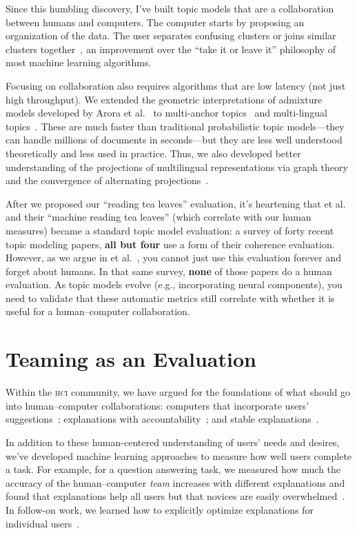 \documentclass[11pt]{amsart}
\newcommand{\abr}[1]{\textsc{#1}}
\newcommand{\newcite}[2]{\capitalisewords{#1} et al.~\cite{#1-#2}}
\begin{document}
Since this humbling discovery, I've built topic models that are a
collaboration between humans and computers.  The computer starts by
proposing an organization of the data.  The user separates confusing
clusters or joins similar clusters together~\cite{hu-14:itm}, an
improvement over the ``take it or leave it'' philosophy of most
machine learning algorithms.

Focusing on collaboration also requires algorithms that are low
latency (not just high throughput). We extended the
geometric interpretations of admixture models developed by Arora et
al.~\cite{arora-12} to multi-anchor topics~\cite{lund-17} and
multi-lingual topics~\cite{Yuan-18}.
%
These are much faster than traditional probabilistic topic
models---they can handle millions of documents in seconds---but they
are less well understood theoretically and less used in practice.
%
Thus, we also developed better understanding of the projections of
multilingual representations via graph theory~\cite{Fujinuma-19} and
the convergence of alternating projections~\cite{Zhang-19}.

After we proposed our ``reading tea leaves'' evaluation, it's
heartening that \newcite{lau}{14} and their ``machine reading tea
leaves'' (which correlate with our human measures) became a standard
topic model evaluation: a survey of forty recent topic modeling
papers, {\bf all but four} use a form of their coherence evaluation.
%
However, as we argue in \newcite{hoyle}{21}, you cannot just use this
evaluation forever and forget about humans.
%
In that same survey, {\bf none} of those papers do a human evaluation.
%
As topic models evolve (e.g., incorporating
neural components), you need to validate that these automatic metrics
still correlate with whether it is useful for a human--computer
collaboration.

\section{Teaming as an Evaluation}

Within the \abr{hci} community, we have argued for the foundations of
what should go into human--computer collaborations: computers that incorporate
users' suggestions~\cite{kumar-19}; explanations with
accountability~\cite{smith-20}; and stable
explanations~\cite{smith-20:adherence}.

In addition to these human-centered understanding of users' needs and
desires, we've developed machine learning approaches to measure how
well users complete a task.
%
For example, for a question answering task, we measured how much the
accuracy of the human--computer \emph{team} increases with different
explanations and found that explanations help all users but that
novices are easily overwhelmed~\cite{feng-19}.
%
In follow-on work, we learned how to explicitly optimize explanations
for individual users~\cite{feng-22}.
\end{document}
